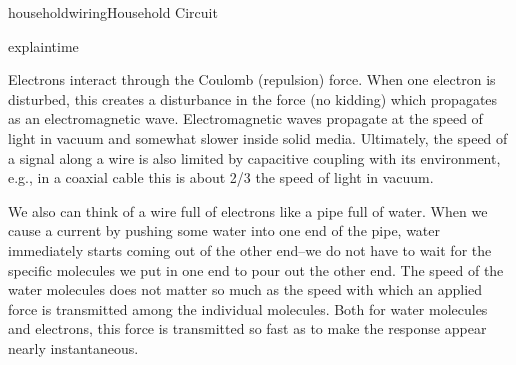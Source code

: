 \begin{mainquestion}{householdwiring}{Household Circuit}
\begin{partquestion}{explaintime}
\begin{answer}
Electrons interact through the Coulomb (repulsion) force. When one electron is disturbed, this creates a disturbance in the force (no kidding) which propagates as an electromagnetic wave. Electromagnetic waves propagate at the speed of light in vacuum and somewhat slower inside solid media. Ultimately, the speed of a signal along a wire is also limited by capacitive coupling with its environment, e.g., in a coaxial cable this is about 2/3 the speed of light in vacuum.

We also can think of a wire full of electrons like a pipe full of water. When we cause a current by pushing some water into one end of the pipe, water immediately starts coming out of the other end–we do not have to wait for the specific molecules we put in one end to pour out the other end. The speed of the water molecules does not matter so much as the speed with which an applied force is transmitted among the individual molecules. Both for water molecules and electrons, this force is transmitted so fast as to make the response appear nearly instantaneous.
\end{answer}
\end{partquestion}

\end{mainquestion}